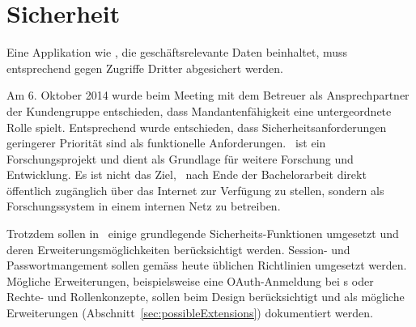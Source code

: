 \section{Sicherheit}
	Eine Applikation wie \eeppi , die geschäftsrelevante Daten beinhaltet, muss entsprechend gegen Zugriffe Dritter abgesichert werden.
	
	Am 6. Oktober 2014 wurde beim Meeting mit dem Betreuer als Ansprechpartner der Kundengruppe entschieden,
	dass Mandantenfähigkeit eine untergeordnete Rolle spielt.
	Entsprechend wurde entschieden, dass Sicherheitsanforderungen geringerer Priorität sind als funktionelle Anforderungen.
	\eeppi\ ist ein Forschungsprojekt und dient als Grundlage für weitere Forschung und Entwicklung. Es ist nicht das Ziel, \eeppi\ nach Ende der Bachelorarbeit direkt öffentlich zugänglich über das Internet zur Verfügung zu stellen, sondern als Forschungssystem in einem internen Netz zu betreiben.
	
	Trotzdem sollen in \eeppi\ einige grundlegende Sicherheits-Funktionen umgesetzt und deren Erweiterungsmöglichkeiten berücksichtigt werden.
	Session- und Passwortmangement sollen gemäss heute üblichen Richtlinien umgesetzt werden.
	Mögliche Erweiterungen, beispielsweise eine OAuth-Anmeldung bei \ppt s oder Rechte- und Rollenkonzepte, sollen beim Design berücksichtigt und als mögliche Erweiterungen (Abschnitt~\ref{sec:possibleExtensions}) dokumentiert werden.